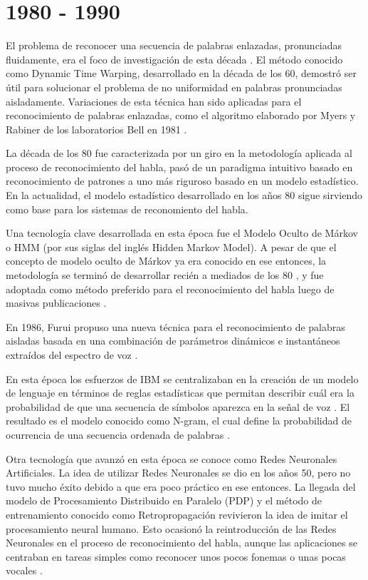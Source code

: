 \section{1980 - 1990}
\label{sec:80s}

El problema de reconocer una secuencia de palabras enlazadas, pronunciadas fluidamente, era el foco
de investigaci\'{o}n de esta d\'{e}cada \cite{Furui50Years2004}. El m\'{e}todo conocido como 
Dynamic Time Warping, desarrollado en la d\'{e}cada de los 60, demostr\'{o} ser \'{u}til para solucionar el problema de no uniformidad
en palabras pronunciadas aisladamente. Variaciones de esta t\'{e}cnica han sido aplicadas para el 
reconocimiento de palabras enlazadas, como el algoritmo elaborado por Myers y Rabiner de los laboratorios Bell
en 1981 \cite{MyersALevel1981}.

La d\'{e}cada de los 80 fue caracterizada por un giro en la metodolog\'{i}a aplicada al proceso de
reconocimiento del habla, pas\'{o} de un paradigma intuitivo basado en reconocimiento de patrones 
a uno m\'{a}s riguroso basado en un modelo estad\'{i}stico. En la actualidad, el modelo estad\'{i}stico
desarrollado en los a\~{n}os 80 sigue sirviendo como base para los sistemas de reconomiento del habla.

Una tecnolog\'{i}a clave desarrollada en esta \'{e}poca fue el Modelo Oculto de M\'{a}rkov o 
HMM (por sus siglas del ingl\'{e}s Hidden Markov Model). A pesar de que el concepto de modelo oculto
de M\'{a}rkov ya era conocido en ese entonces, la metodolog\'{i}a se termin\'{o} de desarrollar reci\'{e}n a mediados
de los 80 \cite{JuangAutomaticSpeech}, y fue adoptada como m\'{e}todo preferido para el reconocimiento del habla luego de 
masivas publicaciones \cite{LevinsonAnIntroduction1983, FergusonHidden1980}.

En 1986, Furui propuso una nueva t\'{e}cnica para el reconocimiento de palabras aisladas basada en
una combinaci\'{o}n de par\'{a}metros din\'{a}micos e instant\'{a}neos 
extra\'{i}dos del espectro de voz \cite{FuruiSpeaker1986}.

En esta \'{e}poca los esfuerzos de IBM se centralizaban en la creaci\'{o}n de un modelo de lenguaje en t\'{e}rminos de
reglas estad\'{i}sticas que permitan describir cu\'{a}l era la probabilidad de que una 
secuencia de s\'{i}mbolos aparezca en la se\~{n}al de voz \cite{Furui50Years2004}. El resultado es el
modelo conocido como N-gram, el cual define la probabilidad de ocurrencia de una secuencia ordenada
de palabras \cite{JelinekTheDevelopment1986}.

Otra tecnolog\'{i}a que avanz\'{o} en esta \'{e}poca se conoce como Redes Neuronales Artificiales. La idea 
de utilizar Redes Neuronales se dio en los a\~{n}os 50, pero no tuvo
mucho \'{e}xito debido a que era poco pr\'{a}ctico en ese entonces. La llegada del modelo de Procesamiento Distribuido 
en Paralelo (PDP) y el m\'{e}todo de entrenamiento conocido como Retropropagaci\'{o}n
revivieron la idea de imitar el procesamiento neural humano. Esto ocasion\'{o} la reintroducci\'{o}n de
las Redes Neuronales en el proceso de reconocimiento del habla, aunque las aplicaciones se centraban en tareas simples como reconocer unos pocos 
fonemas o unas pocas vocales \cite{JuangAutomaticSpeech}.

